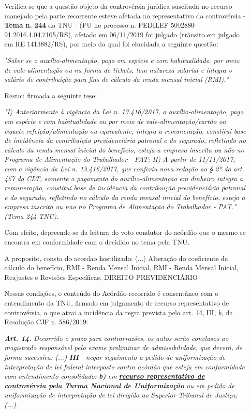 \documentclass[12pt]{article}
\begin{document}
\justifying
\noindent Verifica-se que a questão objeto da controvérsia jurídica suscitada no recurso manejado pela parte recorrente esteve afetada no representativo da controvérsia - \textbf{Tema n. }\textbf{244} da TNU - (PU no processo n. PEDILEF 5002880-91.2016.4.04.7105/RS),  afetado em 06/11/2019 foi julgado (trânsito em julgado em RE 1413882/RS), por meio do qual foi elucidada a seguinte questão:

\noindent \textit{"Saber se o auxílio-alimentação, pago em espécie e com habitualidade, por meio de vale-alimentação ou na forma de tickets, tem natureza salarial e integra o salário de contribuição para fins de cálculo da renda mensal inicial (RMI)."}

\noindent Restou firmada a seguinte tese:

\noindent \textit{"I) Anteriormente à vigência da Lei n. 13.416/2017, o auxílio-alimentação, pago em espécie e com habitualidade ou por meio de vale-alimentação/cartão ou tíquete-refeição/alimentação ou equivalente, integra a remuneração, constitui base de incidência da contribuição previdenciária patronal e do segurado, refletindo no cálculo da renda mensal inicial do benefício, esteja a empresa inscrita ou não no Programa de Alimentação do Trabalhador - PAT; II) A partir de 11/11/2017, com a vigência da Lei n. 13.416/2017, que conferiu nova redação ao § 2º do art. 457 da CLT, somente o pagamento do auxílio-alimentação em dinheiro integra a remuneração, constitui base de incidência da contribuição previdenciária patronal e do segurado, refletindo no cálculo da renda mensal inicial do benefício, esteja a empresa inscrita ou não no Programa de Alimentação do Trabalhador - PAT." (Tema 244 TNU).}

\noindent Com efeito, depreende-se da leitura do voto condutor do acórdão que o mesmo se encontra em conformidade com o decidido no  tema pela TNU.

\noindent A proposito, consta do acordao hostilizado: (...) Alteração do coeficiente de cálculo do benefício, RMI - Renda Mensal Inicial, RMI - Renda Mensal Inicial, Reajustes e Revisões Específicas, DIREITO PREVIDENCIÁRIO

\noindent Nessas condições, o conteúdo do Acórdão recorrido é consentâneo com o entendimento da TNU, firmado em julgamento de recurso representativo de controvérsia, o que atrai a incidência da regra prevista pelo art. 14, III, \textit{b,} da Resolução CJF n. 586/2019:

\noindent \textit{\textbf{Art. 14.}}\textit{ Decorrido o prazo para contrarrazões, os autos serão conclusos ao magistrado responsável pelo exame preliminar de admissibilidade, que deverá, de forma sucessiva: (...) }\textit{\textbf{III }}\textit{- negar seguimento a pedido de uniformização de interpretação de lei federal interposto contra acórdão que esteja em conformidade com entendimento consolidado: }\textit{\textbf{b)}}\textit{ em }\uline{\textit{\textbf{recurso representativo de controvérsia pela Turma Nacional de Uniformização}}}\textit{ ou em pedido de uniformização de interpretação de lei dirigido ao Superior Tribunal de Justiça;(...).}
\end{document}
